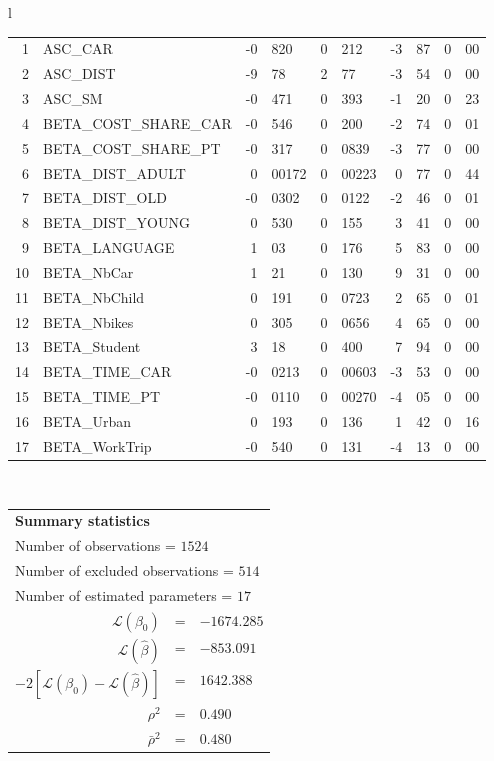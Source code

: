 \begin{tabular}{l}
\begin{tabular}{rlr@{.}lr@{.}lr@{.}lr@{.}l}
1 & ASC_CAR & -0&820 & 0&212 & -3&87 & 0&00\\
2 & ASC_DIST & -9&78 & 2&77 & -3&54 & 0&00\\
3 & ASC_SM & -0&471 & 0&393 & -1&20 & 0&23\\
4 & BETA_COST_SHARE_CAR & -0&546 & 0&200 & -2&74 & 0&01\\
5 & BETA_COST_SHARE_PT & -0&317 & 0&0839 & -3&77 & 0&00\\
6 & BETA_DIST_ADULT & 0&00172 & 0&00223 & 0&77 & 0&44\\
7 & BETA_DIST_OLD & -0&0302 & 0&0122 & -2&46 & 0&01\\
8 & BETA_DIST_YOUNG & 0&530 & 0&155 & 3&41 & 0&00\\
9 & BETA_LANGUAGE & 1&03 & 0&176 & 5&83 & 0&00\\
10 & BETA_NbCar & 1&21 & 0&130 & 9&31 & 0&00\\
11 & BETA_NbChild & 0&191 & 0&0723 & 2&65 & 0&01\\
12 & BETA_Nbikes & 0&305 & 0&0656 & 4&65 & 0&00\\
13 & BETA_Student & 3&18 & 0&400 & 7&94 & 0&00\\
14 & BETA_TIME_CAR & -0&0213 & 0&00603 & -3&53 & 0&00\\
15 & BETA_TIME_PT & -0&0110 & 0&00270 & -4&05 & 0&00\\
16 & BETA_Urban & 0&193 & 0&136 & 1&42 & 0&16\\
17 & BETA_WorkTrip & -0&540 & 0&131 & -4&13 & 0&00\\
\hline
\end{tabular}
\\
\begin{tabular}{rcl}
\multicolumn{3}{l}{\bf Summary statistics}\\
\multicolumn{3}{l}{ Number of observations = $1524$} \\
\multicolumn{3}{l}{ Number of excluded observations = $514$} \\
\multicolumn{3}{l}{ Number of estimated  parameters = $17$} \\
 $\mathcal{L}(\beta_0)$ &=&  $-1674.285$ \\
 $\mathcal{L}(\hat{\beta})$ &=& $-853.091 $  \\
 $-2[\mathcal{L}(\beta_0) -\mathcal{L}(\hat{\beta})]$ &=& $1642.388$ \\
    $\rho^2$ &=&   $0.490$ \\
    $\bar{\rho}^2$ &=&    $0.480$ \\
\end{tabular}
  \end{tabular}
